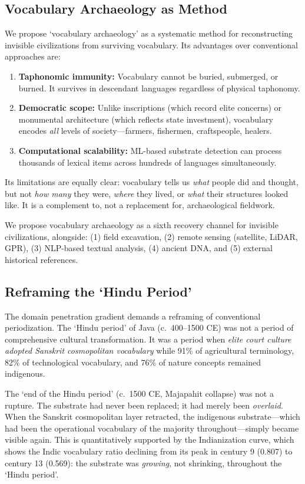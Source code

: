 \documentclass[12pt,a4paper]{article}
\begin{document}
\subsection{Vocabulary Archaeology as Method}

We propose `vocabulary archaeology' as a systematic method for reconstructing invisible civilizations from surviving vocabulary. Its advantages over conventional approaches are:

\begin{enumerate}
\item \textbf{Taphonomic immunity:} Vocabulary cannot be buried, submerged, or burned. It survives in descendant languages regardless of physical taphonomy.
\item \textbf{Democratic scope:} Unlike inscriptions (which record elite concerns) or monumental architecture (which reflects state investment), vocabulary encodes \textit{all} levels of society---farmers, fishermen, craftspeople, healers.
\item \textbf{Computational scalability:} ML-based substrate detection can process thousands of lexical items across hundreds of languages simultaneously.
\end{enumerate}

Its limitations are equally clear: vocabulary tells us \textit{what} people did and thought, but not \textit{how many} they were, \textit{where} they lived, or \textit{what} their structures looked like. It is a complement to, not a replacement for, archaeological fieldwork.

We propose vocabulary archaeology as a sixth recovery channel for invisible civilizations, alongside: (1) field excavation, (2) remote sensing (satellite, LiDAR, GPR), (3) NLP-based textual analysis, (4) ancient DNA, and (5) external historical references.

\subsection{Reframing the `Hindu Period'}

The domain penetration gradient demands a reframing of conventional periodization. The `Hindu period' of Java (c.\ 400--1500 CE) was not a period of comprehensive cultural transformation. It was a period when \textit{elite court culture adopted Sanskrit cosmopolitan vocabulary} while 91\% of agricultural terminology, 82\% of technological vocabulary, and 76\% of nature concepts remained indigenous.

The `end of the Hindu period' (c.\ 1500 CE, Majapahit collapse) was not a rupture. The substrate had never been replaced; it had merely been \textit{overlaid}. When the Sanskrit cosmopolitan layer retracted, the indigenous substrate---which had been the operational vocabulary of the majority throughout---simply became visible again. This is quantitatively supported by the Indianization curve, which shows the Indic vocabulary ratio declining from its peak in century 9 (0.807) to century 13 (0.569): the substrate was \textit{growing}, not shrinking, throughout the `Hindu period'.
\end{document}
